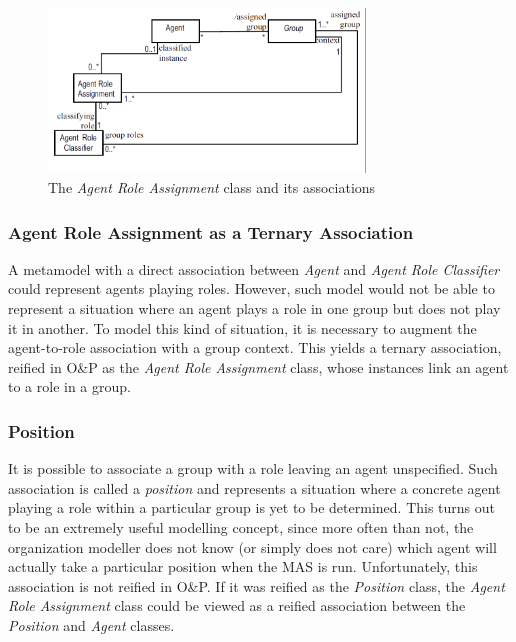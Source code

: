 \begin{figure}[ht]
	\centering
	\includegraphics[width=0.75\textwidth]{images/onp/agent-role-assignment.png}
	\caption{The \textit{Agent Role Assignment} class and its associations}
	\label{figure:onp-agent-role-assignment}
\end{figure}

\subsubsection*{Agent Role Assignment as a Ternary Association}

A metamodel with a direct association between \textit{Agent} and \textit{Agent Role Classifier} could represent agents playing roles.
However, such model would not be able to represent a situation where an agent plays a role in one group but does not play it in another.
To model this kind of situation, it is necessary to augment the agent-to-role association with a group context.
This yields a ternary association, reified in O\&P as the \textit{Agent Role Assignment} class, whose instances link an agent to a role in a group.

\subsubsection*{Position}

It is possible to associate a group with a role leaving an agent unspecified.
Such association is called a \textit{position} and represents a situation where a concrete agent playing a role within a particular group is yet to be determined.
This turns out to be an extremely useful modelling concept, since more often than not, the organization modeller does not know (or simply does not care) which agent will actually take a particular position when the MAS is run.
Unfortunately, this association is not reified in O\&P.
If it was reified as the \textit{Position} class, the \textit{Agent Role Assignment} class could be viewed as a reified association between the \textit{Position} and \textit{Agent} classes.